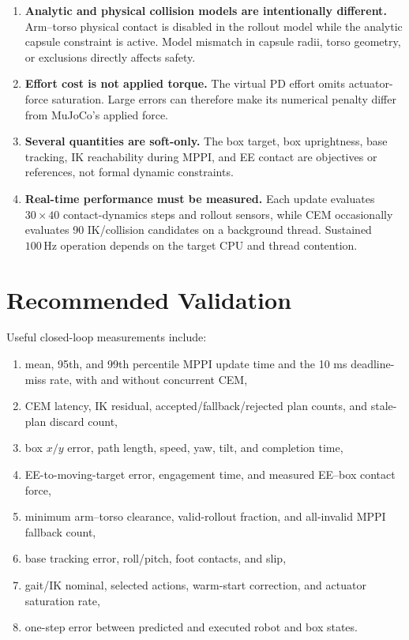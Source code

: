 \documentclass[11pt,a4paper]{article}
\begin{document}
\begin{enumerate}
  \item \textbf{Analytic and physical collision models are intentionally
  different.}
  Arm--torso physical contact is disabled in the rollout model while the
  analytic capsule constraint is active. Model mismatch in capsule radii,
  torso geometry, or exclusions directly affects safety.

  \item \textbf{Effort cost is not applied torque.}
  The virtual PD effort omits actuator-force saturation. Large errors can
  therefore make its numerical penalty differ from MuJoCo's applied force.

  \item \textbf{Several quantities are soft-only.}
  The box target, box uprightness, base tracking, IK reachability during MPPI,
  and EE contact are objectives or references, not formal dynamic constraints.

  \item \textbf{Real-time performance must be measured.}
  Each update evaluates $30\times40$ contact-dynamics steps and rollout
  sensors, while CEM occasionally evaluates 90 IK/collision candidates on a
  background thread. Sustained $100\,\mathrm{Hz}$ operation depends on the
  target CPU and thread contention.
\end{enumerate}

\section{Recommended Validation}

Useful closed-loop measurements include:
\begin{enumerate}
  \item mean, 95th, and 99th percentile MPPI update time and the 10 ms
        deadline-miss rate, with and without concurrent CEM,
  \item CEM latency, IK residual, accepted/fallback/rejected plan counts, and
        stale-plan discard count,
  \item box $x/y$ error, path length, speed, yaw, tilt, and completion time,
  \item EE-to-moving-target error, engagement time, and measured EE--box
        contact force,
  \item minimum arm--torso clearance, valid-rollout fraction, and all-invalid
        MPPI fallback count,
  \item base tracking error, roll/pitch, foot contacts, and slip,
  \item gait/IK nominal, selected actions, warm-start correction, and actuator
        saturation rate,
  \item one-step error between predicted and executed robot and box states.
\end{enumerate}
\end{document}
